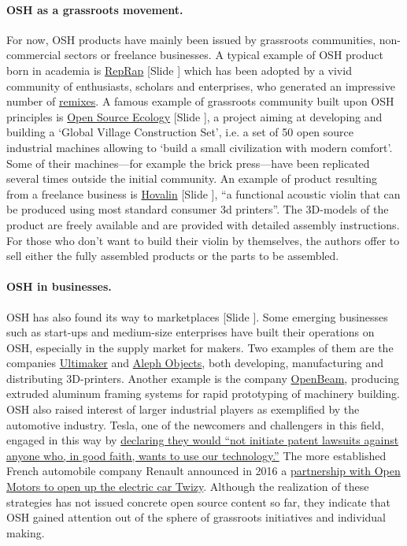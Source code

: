 \documentclass{article}
\newcounter{slide}
\begin{document}
\paragraph{OSH as a grassroots movement.} For now, OSH products have mainly been issued by grassroots communities, non-commercial sectors or freelance businesses. A typical example of OSH product born in academia is \href{https://reprap.org}{RepRap} {\color{blue}[Slide ]} which has been adopted by a vivid community of enthusiasts, scholars and enterprises, who generated an impressive number of \href{https://reprap.org/wiki/RepRap_Family_Tree}{remixes}. A famous example of grassroots community built upon OSH principles is \href{https://www.opensourceecology.org/}{Open Source Ecology} {\color{blue}[Slide ]}, a project aiming at developing and building a `Global Village Construction Set', i.e. a set of 50 open source industrial machines allowing to `build a small civilization with modern comfort'. Some of their machines---for example the brick press---have been replicated several times outside the initial community. An example of product resulting from a freelance business is \href{http://www.hovalabs.com/hova-instruments/hovalin}{Hovalin} {\color{blue}[Slide ]}, ``a functional acoustic violin that can be produced using most standard consumer 3d printers''. The 3D-models of the product are freely available and are provided with detailed assembly instructions. For those who don't want to build their violin by themselves, the authors offer to sell either the fully assembled products or the parts to be assembled.

\paragraph{OSH in businesses.} OSH has also found its way to marketplaces {\color{blue}[Slide ]}. Some emerging businesses such as start-ups and medium-size enterprises have built their operations on OSH, especially in the supply market for makers. Two examples of them are the companies \href{https://ultimaker.com/}{Ultimaker} and \href{https://www.alephobjects.com/}{Aleph Objects}, both developing, manufacturing and distributing 3D-printers. Another example is the company \href{https://ztautomations.com/openbeam/}{OpenBeam}, producing extruded aluminum framing systems for rapid prototyping of machinery building. OSH also raised interest of larger industrial players as exemplified by the automotive industry. Tesla, one of the newcomers and challengers in this field, engaged in this way by \href{https://www.tesla.com/blog/all-our-patent-are-belong-you}{declaring they would ``not initiate patent lawsuits against anyone who, in good faith, wants to use our technology.''} The more established French automobile company Renault announced in 2016 a \href{https://www.openmotors.co/renaultpomsignup/}{partnership with Open Motors to open up the electric car Twizy}. Although the realization of these strategies has not issued concrete open source content so far, they indicate that OSH gained attention out of the sphere of grassroots initiatives and individual making.
\end{document}
